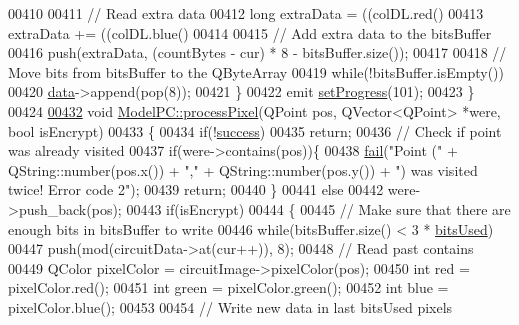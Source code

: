 \begin{DoxyCode}
00410 
00411         \textcolor{comment}{// Read extra data}
00412         \textcolor{keywordtype}{long} extraData = ((colDL.red() %
00413         extraData += ((colDL.blue() %
00414 
00415         \textcolor{comment}{// Add extra data to the bitsBuffer}
00416         push(extraData, (countBytes - cur) * 8 - bitsBuffer.size());
00417 
00418         \textcolor{comment}{// Move bits from bitsBuffer to the QByteArray}
00419         \textcolor{keywordflow}{while}(!bitsBuffer.isEmpty())
00420             \mbox{\hyperlink{namespace_errors_dict_setup_af570460846fb9f0c91abd308a095dcdc}{data}}->append(pop(8));
00421     \}
00422     emit \mbox{\hyperlink{class_model_p_c_a25a4496e129e87ac96f12257a123b84f}{setProgress}}(101);
00423 \}
00424 
\mbox{\hyperlink{class_model_p_c_a1171f9fe1550133dc9053a46b4e5bcfd}{00432}} \textcolor{keywordtype}{void} \mbox{\hyperlink{class_model_p_c_a1171f9fe1550133dc9053a46b4e5bcfd}{ModelPC::processPixel}}(QPoint pos, QVector<QPoint> *were, \textcolor{keywordtype}{bool} isEncrypt)
00433 \{
00434     \textcolor{keywordflow}{if}(!\mbox{\hyperlink{class_model_p_c_a945ffbbc44a832b953c191debd448f4c}{success}})
00435         \textcolor{keywordflow}{return};
00436     \textcolor{comment}{// Check if point was already visited}
00437     \textcolor{keywordflow}{if}(were->contains(pos))\{
00438         \mbox{\hyperlink{class_model_p_c_a47464b59b7e37fcee25e55475708aabd}{fail}}(\textcolor{stringliteral}{"Point ("} + QString::number(pos.x()) + \textcolor{stringliteral}{","} + QString::number(pos.y()) + \textcolor{stringliteral}{") was visited
       twice! Error code 2"});
00439         \textcolor{keywordflow}{return};
00440     \}
00441     \textcolor{keywordflow}{else}
00442         were->push\_back(pos);
00443     \textcolor{keywordflow}{if}(isEncrypt)
00444     \{
00445         \textcolor{comment}{// Make sure that there are enough bits in bitsBuffer to write}
00446         \textcolor{keywordflow}{while}(bitsBuffer.size() < 3 * \mbox{\hyperlink{class_model_p_c_a655deb6a8afa94c7f4aadb3056989038}{bitsUsed}})
00447             push(mod(circuitData->at(cur++)), 8);
00448         \textcolor{comment}{// Read past contains}
00449         QColor pixelColor = circuitImage->pixelColor(pos);
00450         \textcolor{keywordtype}{int} red = pixelColor.red();
00451         \textcolor{keywordtype}{int} green = pixelColor.green();
00452         \textcolor{keywordtype}{int} blue = pixelColor.blue();
00453 
00454         \textcolor{comment}{// Write new data in last bitsUsed pixels}

\end{DoxyCode}
